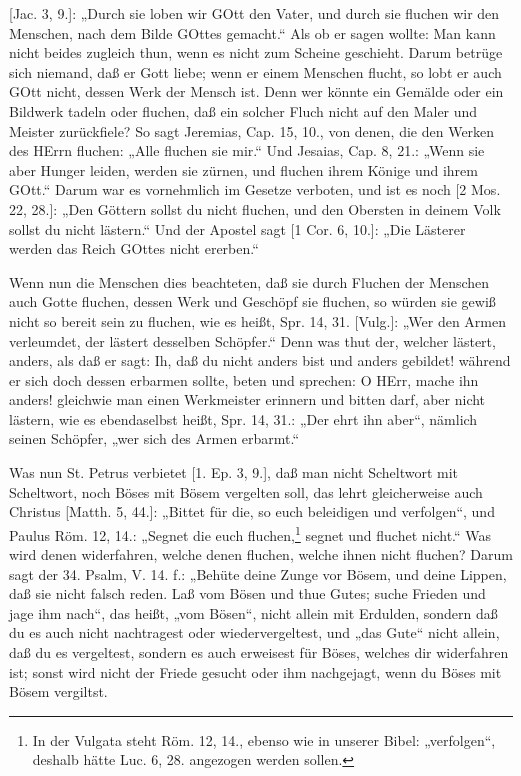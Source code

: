 [Jac. 3, 9.]: „Durch sie loben wir GOtt den Vater, und durch sie fluchen wir den Menschen,
nach dem Bilde GOttes gemacht.“ Als ob er sagen wollte: Man kann nicht beides zugleich thun, wenn es nicht zum Scheine geschieht. Darum betrüge sich niemand, daß er Gott liebe; wenn er einem Menschen flucht, so lobt er auch GOtt nicht, dessen Werk der Mensch ist. Denn wer könnte ein Gemälde oder ein Bildwerk tadeln oder fluchen, daß ein solcher Fluch nicht auf den Maler und Meister zurückfiele? So sagt Jeremias, Cap. 15, 10., von denen, die den Werken des HErrn fluchen: „Alle fluchen sie mir.“ Und Jesaias, Cap. 8, 21.: „Wenn sie aber Hunger leiden, werden sie zürnen, und fluchen ihrem Könige und ihrem GOtt.“ Darum war es vornehmlich im Gesetze verboten, und ist es noch [2 Mos. 22, 28.]: „Den Göttern sollst du nicht fluchen, und den Obersten in deinem Volk sollst du nicht lästern.“ Und der Apostel sagt [1 Cor. 6, 10.]: „Die Lästerer werden das Reich GOttes nicht ererben.“

Wenn nun die Menschen dies beachteten, daß sie durch Fluchen der Menschen auch Gotte fluchen, dessen Werk und Geschöpf sie fluchen, so würden sie gewiß nicht so bereit sein zu fluchen, wie es heißt, Spr. 14, 31. [Vulg.]: „Wer den Armen verleumdet, der lästert desselben Schöpfer.“ Denn was thut der, welcher lästert, anders, als daß er sagt: Ih, daß du nicht anders bist und anders gebildet! während er sich doch dessen erbarmen sollte, beten und sprechen: O HErr, mache ihn anders! gleichwie man einen Werkmeister erinnern und bitten darf, aber nicht lästern, wie es ebendaselbst heißt, Spr. 14, 31.: „Der ehrt ihn aber“, nämlich seinen Schöpfer, „wer sich des Armen erbarmt.“

Was nun St. Petrus verbietet [1. Ep. 3, 9.], daß man nicht Scheltwort mit Scheltwort, noch Böses mit Bösem vergelten soll, das lehrt gleicherweise auch Christus [Matth. 5, 44.]: „Bittet für die, so euch beleidigen und verfolgen“, und Paulus Röm. 12, 14.: „Segnet die euch fluchen,\footnote{In der Vulgata steht Röm. 12, 14., ebenso wie in unserer Bibel: „verfolgen“, deshalb hätte Luc. 6, 28. angezogen werden sollen.} segnet und fluchet nicht.“ Was wird denen widerfahren, welche denen fluchen, welche ihnen nicht fluchen? Darum sagt der 34. Psalm, V. 14. f.: „Behüte deine Zunge vor Bösem, und deine Lippen, daß sie nicht falsch reden. Laß vom Bösen und thue Gutes; suche Frieden und jage ihm nach“, das heißt, „vom Bösen“, nicht allein mit Erdulden, sondern daß du es auch nicht nachtragest oder wiedervergeltest, und „das Gute“ nicht allein, daß du es vergeltest, sondern es auch erweisest für Böses, welches dir widerfahren ist; sonst wird nicht der Friede gesucht oder ihm nachgejagt, wenn du Böses mit Bösem vergiltst.

